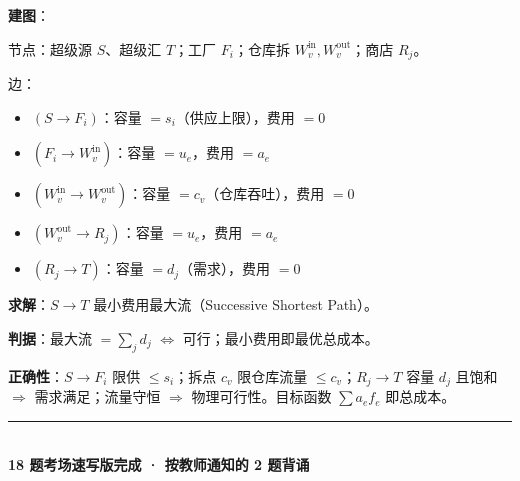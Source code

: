 \documentclass[11pt,a4paper]{ctexart}
\begin{document}
\textbf{建图}：

节点：超级源 $S$、超级汇 $T$；工厂 $F_i$；仓库拆 $W_v^{\text{in}}, W_v^{\text{out}}$；商店 $R_j$。

边：
\begin{itemize}
\item $(S \to F_i)$：容量 $= s_i$（供应上限），费用 $= 0$
\item $(F_i \to W_v^{\text{in}})$：容量 $= u_e$，费用 $= a_e$
\item $(W_v^{\text{in}} \to W_v^{\text{out}})$：容量 $= c_v$（仓库吞吐），费用 $= 0$
\item $(W_v^{\text{out}} \to R_j)$：容量 $= u_e$，费用 $= a_e$
\item $(R_j \to T)$：容量 $= d_j$（需求），费用 $= 0$
\end{itemize}

\textbf{求解}：$S\to T$ 最小费用最大流（Successive Shortest Path）。

\textbf{判据}：最大流 $= \sum_j d_j$ $\Leftrightarrow$ 可行；最小费用即最优总成本。

\textbf{正确性}：$S\to F_i$ 限供 $\leq s_i$；拆点 $c_v$ 限仓库流量 $\leq c_v$；$R_j\to T$ 容量 $d_j$ 且饱和 $\Rightarrow$ 需求满足；流量守恒 $\Rightarrow$ 物理可行性。目标函数 $\sum a_e f_e$ 即总成本。


\vspace{1em}
\begin{center}
\rule{0.6\textwidth}{0.4pt}\\[4pt]
{\large \textbf{18 题考场速写版完成 · 按教师通知的 2 题背诵}}
\end{center}
\end{document}

